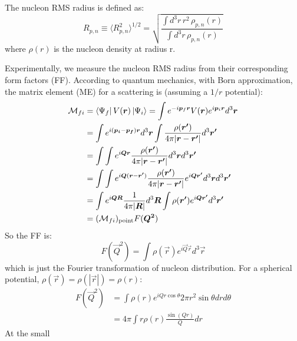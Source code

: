 The nucleon RMS radius is defined as:
\begin{equation}
    R_{p, n} \equiv \langle R_{p,n}^2\rangle^{1/2} = \sqrt{\frac{\int d^3r\,r^2\,\rho_{p,n}(r)}{\int d^3r\,\rho_{p,n}(r)}}
    \label{eqn:rms_radius}
\end{equation}
where $\rho(r)$ is the nucleon density at radius r. 

Experimentally, we measure the nucleon RMS radius from their corresponding form
factors (FF). According to quantum mechanics, with Born approximation, the
matrix element (ME) for a scattering is (assuming a $1/r$ potential):
\begin{equation*}
    \begin{aligned}
	\CM_{fi} &= \bra{\Psi_f}V(\vec{r})\ket{\Psi_i} 
		= \int e^{-i\vec{p}_f\vec{r}}V(\vec{r}) e^{i\vec{p}_i\vec{r}} d^3\vec{r}    \\	%
	    &= \int e^{i(\vec{p_i} - \vec{p_f})\vec{r}} d^3\vec{r} 
		\int \frac{\rho(\vec{r'})}{4\pi|\vec{r} - \vec{r'}|} d^3\vec{r'} \\	%
	    &= \int \int e^{i\vec{Q} \vec{r} } 
		 \frac{\rho(\vec{r'})}{4\pi|\vec{r} - \vec{r'}|} d^3\vec{r} d^3\vec{r'} \\	%
	    &= \int\int e^{i\vec{Q}(\vec{r} - \vec{r'})} 
		\frac{\rho(\vec{r'})}{4\pi|\vec{r} - \vec{r'}|} e^{i\vec{Q}\vec{r'}} d^3\vec{r} d^3\vec{r'}   \\  %
	    &= \int e^{i\vec{Q}\vec{R}} \frac{1}{4\pi|\vec{R}|} d^3\vec{R} 
		\int \rho(\vec{r'}) e^{i\vec{Q} \vec{r'}}d^3 \vec{r'}	\\  %
	    &= (\CM_{fi})_{\text{point}} F(\vec{Q^2})   \\	%
    \end{aligned}
\end{equation*}
So the FF is:
\begin{equation}
    F(\vec{Q}^2) = \int \rho(\vec{r}) e^{i\vec{Q} \vec{r}} d^3\vec{r}
    \label{eqn:ff}
\end{equation}
which is just the Fourier transformation of nucleon distribution.
For a spherical potential, $\rho(\vec{r}) = \rho({|\vec{r}|}) = \rho(r)$:
\begin{equation*}
    \begin{aligned}
	F(\vec{Q}^2) &= \int \rho(r) e^{iQr\cos\theta} 2\pi r^2 \sin\theta dr d\theta	\\
	    &= 4\pi \int r \rho(r) \frac{\sin{(Qr)}}{Q} dr
    \end{aligned}
\end{equation*}
At the small
